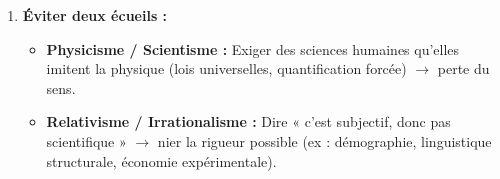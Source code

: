 \documentclass[11pt]{article}
\begin{document}
\begin{methode}
\begin{enumerate}
\begin{itemize}
        \end{itemize}
        \item \textbf{Éviter deux écueils :}
        \begin{itemize}
            \item \textbf{Physicisme / Scientisme :} Exiger des sciences humaines qu'elles imitent la physique (lois universelles, quantification forcée) $\rightarrow$ perte du sens.
            \item \textbf{Relativisme / Irrationalisme :} Dire « c'est subjectif, donc pas scientifique » $\rightarrow$ nier la rigueur possible (ex : démographie, linguistique structurale, économie expérimentale).
        \end{itemize}
    \end{enumerate}
\end{methode}
\end{document}
